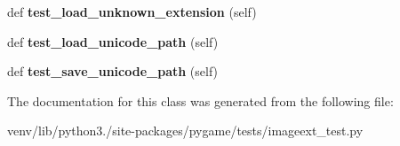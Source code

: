 \begin{DoxyCompactItemize}
\mbox{\label{classpygame_1_1tests_1_1imageext__test_1_1_imageext_module_test_a644d728bf4d855fb71396c482256cb93}} 
def {\bfseries test\+\_\+load\+\_\+unknown\+\_\+extension} (self)
\item 
\mbox{\label{classpygame_1_1tests_1_1imageext__test_1_1_imageext_module_test_a58b10cd89f4d6c76ee5763e143a973fe}} 
def {\bfseries test\+\_\+load\+\_\+unicode\+\_\+path} (self)
\item 
\mbox{\label{classpygame_1_1tests_1_1imageext__test_1_1_imageext_module_test_a1f2da1fc6b76c39af97ebe6ebe085c07}} 
def {\bfseries test\+\_\+save\+\_\+unicode\+\_\+path} (self)
\end{DoxyCompactItemize}


The documentation for this class was generated from the following file\+:\begin{DoxyCompactItemize}
\item 
venv/lib/python3./site-\/packages/pygame/tests/imageext\+\_\+test.\+py\end{DoxyCompactItemize}
